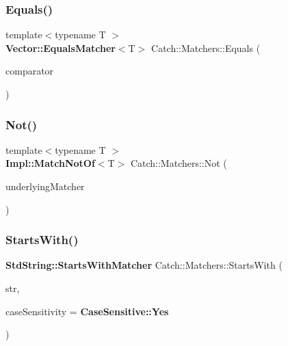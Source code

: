 \mbox{\label{namespace_catch_1_1_matchers_a332a401fb0da33c988e9cfa400ecce1b}} 
\subsubsection{Equals()\hspace{0.1cm}{\footnotesize\ttfamily [2/2]}}
{\footnotesize\ttfamily template$<$typename T $>$ \\
\textbf{ Vector\+::\+Equals\+Matcher}$<$T$>$ Catch\+::\+Matchers\+::\+Equals (\begin{DoxyParamCaption}\item[{std\+::vector$<$ T $>$ const \&}]{comparator }\end{DoxyParamCaption})}

\mbox{\label{namespace_catch_1_1_matchers_acd3369efa3f62ffa1269df4b8ddf8134}} 
\subsubsection{Not()}
{\footnotesize\ttfamily template$<$typename T $>$ \\
\textbf{ Impl\+::\+Match\+Not\+Of}$<$T$>$ Catch\+::\+Matchers\+::\+Not (\begin{DoxyParamCaption}\item[{\textbf{ Impl\+::\+Matcher\+Base}$<$ T $>$ const \&}]{underlying\+Matcher }\end{DoxyParamCaption})\hspace{0.3cm}{\ttfamily [inline]}}

\mbox{\label{namespace_catch_1_1_matchers_a97c9ee09a70378ca7e8c6f9f01b0d6d1}} 
\subsubsection{Starts\+With()}
{\footnotesize\ttfamily \textbf{ Std\+String\+::\+Starts\+With\+Matcher} Catch\+::\+Matchers\+::\+Starts\+With (\begin{DoxyParamCaption}\item[{std\+::string const \&}]{str,  }\item[{\textbf{ Case\+Sensitive\+::\+Choice}}]{case\+Sensitivity = {\ttfamily \textbf{ Case\+Sensitive\+::\+Yes}} }\end{DoxyParamCaption})}

